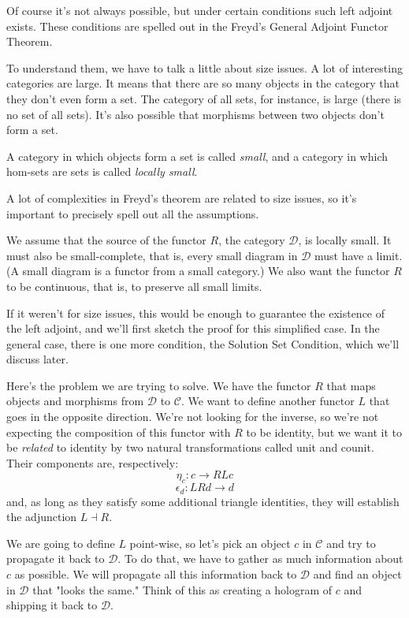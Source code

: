 \documentclass[11pt]{amsart}
\begin{document}
Of course it's not always possible, but under certain conditions such left adjoint exists. These conditions are spelled out in the Freyd's General Adjoint Functor Theorem. 

To understand them, we have to talk a little about size issues. A lot of interesting categories are large. It means that there are so many objects in the category that they don't even form a set. The category of all sets, for instance, is large (there is no set of all sets). It's also possible that morphisms between two objects don't form a set. 

A category in which objects form a set is called \emph{small}, and a category in which hom-sets are sets is called \emph{locally small}. 

A lot of complexities in Freyd's theorem are related to size issues, so it's important to precisely spell out all the assumptions.

We assume that the source of the functor $R$, the category $\mathcal D$, is locally small. It must also be small-complete, that is, every small diagram in $\mathcal D$ must have a limit. (A small diagram is a functor from a small category.) We also want the functor $R$ to be continuous, that is, to preserve all small limits. 

If it weren't for size issues, this would be enough to guarantee the existence of the left adjoint, and we'll first sketch the proof for this simplified case. In the general case, there is one more condition, the Solution Set Condition, which we'll discuss later.

Here's the problem we are trying to solve. We have the functor $R$ that maps objects and morphisms from $\mathcal D$ to $\mathcal C$. We want to define another functor $L$ that goes in the opposite direction. We're not looking for the inverse, so we're not expecting the composition of this functor with $R$ to be identity, but we want it to be \emph{related} to identity by two natural transformations called unit and counit. Their components are, respectively:
\[ \eta_c : c \to R L c\]
\[\epsilon_d : L R d \to d \]
and, as long as they satisfy some additional triangle identities, they will establish the adjunction $L \dashv R$.

We are going to define $L$ point-wise, so let's pick an object $c$ in $\mathcal C$ and try to propagate it back to $\mathcal D$. To do that, we have to gather as much information about $c$ as possible. We will propagate all this information back to $\mathcal D$ and find an object in $\mathcal D$ that "looks the same." Think of this as creating a hologram of $c$ and shipping it back to $\mathcal D$. 
\end{document}
